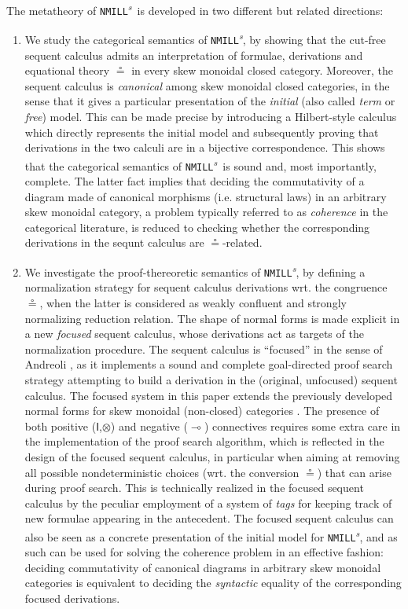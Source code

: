 \documentclass[submission,copyright,creativecommons]{eptcs}
\theoremstyle{definition}
\newcommand{\ot}{\otimes}
\newcommand{\lolli}{\multimap}
\newcommand{\I}{\mathsf{I}}
\newcommand{\NMILL}{\texttt{NMILL}}
\newcommand{\SkNMILL}{\NMILL\textsuperscript{\textit{s}}}
\begin{document}
The metatheory of \SkNMILL\ is developed in two different but related directions:
\begin{enumerate}[($i$)]
  \item We study the categorical semantics of \SkNMILL, by showing that the cut-free sequent calculus admits an interpretation of formulae, derivations and equational theory $\circeq$ in every skew monoidal closed category. Moreover, the sequent calculus is \emph{canonical} among skew monoidal closed categories, in the sense that it gives a particular presentation of the \emph{initial} (also called \emph{term} or \emph{free}) model. This can be made precise by introducing a Hilbert-style calculus which directly represents the initial model and subsequently proving that derivations in the two calculi are in a bijective correspondence.
This shows that the categorical semantics of \SkNMILL\ is sound and, most importantly, complete. The latter fact implies that deciding the commutativity of a diagram made of canonical morphisms (i.e. structural laws) in an arbitrary skew monoidal category, a problem typically referred to as \emph{coherence} in the categorical literature, is reduced to checking whether the corresponding derivations in the sequnt calculus are $\circeq$-related.

\item We investigate the proof-thereoretic semantics of \SkNMILL, by defining a normalization strategy for sequent calculus derivations wrt. the congruence $\circeq$, when the latter is considered as weakly confluent and strongly normalizing reduction relation. The shape of normal forms is made explicit in a new \emph{focused} sequent calculus, whose derivations act as targets of the normalization procedure. The sequent calculus is ``focused'' in the sense of Andreoli \cite{andreoli:logic:1992}, as it implements a sound and complete goal-directed proof search strategy attempting to build a derivation in the (original, unfocused) sequent calculus. The focused system in this paper extends the previously
developed normal forms for skew monoidal (non-closed) categories \cite{uustalu:sequent:2021,uustalu:proof:nodate}. The presence of both positive ($\I$,$\ot$) and negative ($\lolli$) connectives requires some extra care in the implementation of the proof search algorithm, which is reflected in the design of the focused sequent calculus, in particular when aiming at removing all possible nondeterministic choices (wrt. the conversion $\circeq$) that can arise during proof search. This is technically realized in the focused sequent calculus by the peculiar employment of a system of \emph{tags} for keeping track of new formulae appearing in the antecedent. The focused sequent calculus can also be seen as a concrete presentation of the initial model for \SkNMILL, and as such can be used for solving the coherence problem in an effective fashion: deciding commutativity of canonical diagrams in arbitrary skew monoidal categories is equivalent to deciding the \emph{syntactic} equality of the corresponding focused derivations.
\end{enumerate}
\end{document}
